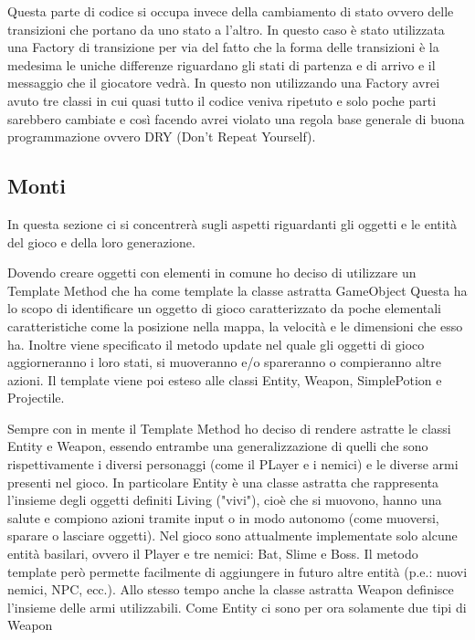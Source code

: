 \documentclass[a4paper,12pt]{report}
\begin{document}
    \par Questa parte di codice si occupa invece della cambiamento di stato ovvero delle transizioni che portano da uno stato
    a l’altro. In questo caso è stato utilizzata una Factory di transizione per via del fatto che la forma delle transizioni
    è la medesima  le uniche differenze riguardano gli stati di partenza e di arrivo e il messaggio che il giocatore vedrà.
    In questo non utilizzando una Factory avrei avuto tre classi in cui quasi tutto il codice veniva ripetuto e solo poche
    parti sarebbero cambiate  e così facendo avrei violato una regola base generale di buona programmazione ovvero
    DRY (Don’t Repeat Yourself).

    \subsection{Monti}
    \par In questa sezione ci si concentrerà sugli aspetti riguardanti gli oggetti e le entità del gioco e della loro generazione.
    \par Dovendo creare oggetti con elementi in comune ho deciso di utilizzare un Template Method che ha come template la classe astratta GameObject
    Questa ha lo scopo di identificare un oggetto di gioco caratterizzato da poche elementali caratteristiche come la posizione nella mappa, la velocità e
    le dimensioni che esso ha.
    Inoltre viene specificato il metodo update nel quale gli oggetti di gioco aggiorneranno i loro stati, si muoveranno e/o spareranno o compieranno altre azioni.
    Il template viene poi esteso alle classi Entity, Weapon, SimplePotion e Projectile.
    \par Sempre con in mente il Template Method ho deciso di rendere astratte le classi Entity e Weapon, essendo entrambe una generalizzazione di quelli
    che sono rispettivamente i diversi personaggi (come il PLayer e i nemici) e le diverse armi presenti nel gioco.
    In particolare Entity è una classe astratta che rappresenta l'insieme degli oggetti definiti Living ("vivi"), cioè che si muovono, hanno una salute
    e compiono azioni tramite input o in modo autonomo (come muoversi, sparare o lasciare oggetti).
    Nel gioco sono attualmente implementate solo alcune entità basilari, ovvero il Player e tre nemici: Bat, Slime e Boss. Il metodo template però permette
    facilmente di aggiungere in futuro altre entità (p.e.: nuovi nemici, NPC, ecc.).
    Allo stesso tempo anche la classe astratta Weapon definisce l'insieme delle armi utilizzabili. Come Entity ci sono per ora solamente due tipi di Weapon
\end{document}

